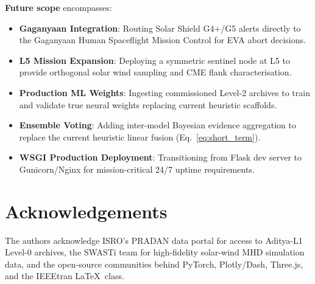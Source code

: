 \documentclass[conference,10pt,twocolumn]{IEEEtran}
\begin{document}
\textbf{Future scope} encompasses:
\begin{itemize}
  \item \textbf{Gaganyaan Integration}: Routing Solar Shield G4+/G5 alerts directly to the Gaganyaan Human Spaceflight Mission Control for EVA abort decisions.
  \item \textbf{L5 Mission Expansion}: Deploying a symmetric sentinel node at L5 to provide orthogonal solar wind sampling and CME flank characterisation.
  \item \textbf{Production ML Weights}: Ingesting commissioned Level-2 archives to train and validate true neural weights replacing current heuristic scaffolds.
  \item \textbf{Ensemble Voting}: Adding inter-model Bayesian evidence aggregation to replace the current heuristic linear fusion (Eq.~\ref{eq:short_term}).
  \item \textbf{WSGI Production Deployment}: Transitioning from Flask dev server to Gunicorn/Nginx for mission-critical 24/7 uptime requirements.
\end{itemize}

\section*{Acknowledgements}
The authors acknowledge ISRO's PRADAN data portal for access to Aditya-L1 Level-0 archives, the SWASTi team for high-fidelity solar-wind MHD simulation data, and the open-source communities behind PyTorch, Plotly/Dash, Three.js, and the IEEEtran \LaTeX\ class.
\end{document}
